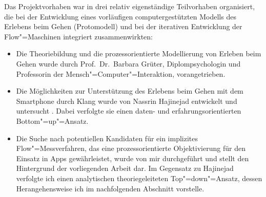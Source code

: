 Das Projektvorhaben war in drei relativ eigenständige Teilvorhaben organisiert, die bei der Entwicklung eines vorläufigen computergestützten Modells des Erlebens beim Gehen (Protomodell) und bei der iterativen Entwicklung der Flow"=Maschinen integriert zusammenwirkten: 
\begin{itemize}
	
	\item Die Theoriebildung und die prozessorientierte Modellierung von Erleben beim Gehen wurde durch Prof.\  Dr.\ Barbara Grüter, Diplompsychologin und Professorin der Mensch"=Computer"=Interaktion, vorangetrieben.
	
	\item Die Möglichkeiten zur Unterstützung des Erlebens beim Gehen mit dem Smartphone durch Klang wurde von Nassrin Hajinejad entwickelt und untersucht \citep{Hajinejad2013, Hajinejad2015}. Dabei verfolgte sie einen daten- und erfahrungsorientierten Bottom"=up"=Ansatz.
	
	\item Die Suche nach potentiellen Kandidaten für ein implizites Flow"=Messverfahren, das eine prozessorientierte Objektivierung für den Einsatz in Apps gewährleistet, wurde von mir durchgeführt und stellt den Hintergrund der vorliegenden Arbeit dar. Im Gegensatz zu Hajinejad verfolgte ich einen analytischen theoriegeleiteten Top"=down"=Ansatz, dessen Herangehensweise ich im nachfolgenden Abschnitt vorstelle. 
\end{itemize}

